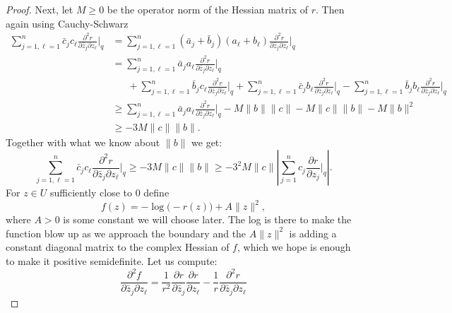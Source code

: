 \documentclass[12pt,openany]{book}
\newcommand{\snorm}[1]{\lVert {#1} \rVert}
\newcommand{\Babs}[1]{\Bigl\lvert {#1} \Bigr\rvert}
\newcommand{\abs}[1]{\left\lvert {#1} \right\rvert}
\theoremstyle{plain}
\theoremstyle{remark}
\theoremstyle{definition}
\theoremstyle{exercise}
\theoremstyle{example}
\begin{document}
\begin{proof}
Next, let $M \geq 0$ be the operator norm of the Hessian matrix of $r$.
Then again using Cauchy-Schwarz
\begin{equation*}
\begin{split}
\sum_{j=1,\ell=1}^n
\bar{c}_j c_\ell \frac{\partial^2 r}{\partial \bar{z}_j \partial z_\ell} \Big|_q 
& =
\sum_{j=1,\ell=1}^n
( \bar{a}_j + \bar{b}_j )  (a_\ell + b_\ell) \frac{\partial^2 r}{\partial \bar{z}_j \partial z_\ell} \Big|_q 
\\
& =
\sum_{j=1,\ell=1}^n
\bar{a}_j a_\ell \frac{\partial^2 r}{\partial \bar{z}_j \partial z_\ell} \Big|_q 
\\
& \phantom{=}~
+
\sum_{j=1,\ell=1}^n
\bar{b}_j c_\ell \frac{\partial^2 r}{\partial \bar{z}_j \partial z_\ell} \Big|_q 
+
\sum_{j=1,\ell=1}^n
\bar{c}_j  b_\ell \frac{\partial^2 r}{\partial \bar{z}_j \partial z_\ell} \Big|_q 
-
\sum_{j=1,\ell=1}^n
\bar{b}_j  b_\ell \frac{\partial^2 r}{\partial \bar{z}_j \partial z_\ell} \Big|_q 
\\
& \geq
\sum_{j=1,\ell=1}^n
\bar{a}_j a_\ell \frac{\partial^2 r}{\partial \bar{z}_j \partial z_\ell} \Big|_q 
-
M\snorm{b}\snorm{c}
-
M\snorm{c}\snorm{b}
-
M\snorm{b}^2
\\
& \geq
-
3 M\snorm{c}\snorm{b} .
\end{split}
\end{equation*}
Together with what we know about
$\snorm{b}$ we get:
\begin{equation*}
\sum_{j=1,\ell=1}^n
\bar{c}_j c_\ell \frac{\partial^2 r}{\partial \bar{z}_j \partial z_\ell} \Big|_q 
\geq -3M \snorm{c} \snorm{b} %
\geq
-3^2 M \snorm{c}\abs{\sum_{j=1}^n c_j \frac{\partial r}{\partial z_j}
\Big|_q} .
\end{equation*}
For $z \in U$ sufficiently close to $0$ define
\begin{equation*}
f(z) = -\log \bigl(-r(z)\bigr) + A \snorm{z}^2 ,
\end{equation*}
where $A > 0$ is some constant we will choose later.
The log is there to make the function blow up as we approach the boundary
and the $A \snorm{z}^2$ is adding a constant diagonal matrix to the complex
Hessian of $f$, which we hope is enough to make it positive semidefinite.
Let us compute:
\begin{equation*}
\frac{\partial^2 f}{\partial \bar{z}_j \partial z_\ell}
=
\frac{1}{r^2}
\frac{\partial r}{\partial \bar{z}_j}
\frac{\partial r}{\partial z_\ell}
-
\frac{1}{r}
\frac{\partial^2 r}{\partial \bar{z}_j \partial z_\ell} 

\end{equation*}
\end{proof}
\end{document}

